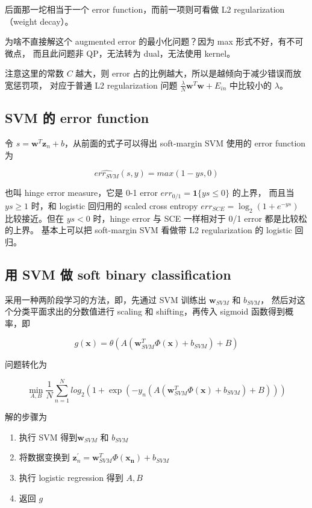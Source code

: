 \documentclass[a4paper]{article}
\begin{document}
后面那一坨相当于一个 error function，而前一项则可看做 L2 regularization（weight decay）。

为啥不直接解这个 augmented error 的最小化问题？因为 max 形式不好，有不可微点，
而且此问题非 QP，无法转为 dual，无法使用 kernel。

注意这里的常数 $C$ 越大，则 error 占的比例越大，所以是越倾向于减少错误而放宽惩罚项，
对应于普通 L2 regularization 问题 $\displaystyle \frac{\lambda}{N}\mathbf{w}^T\mathbf{w} + E_{in}$
中比较小的 $\lambda$。

\subsection{SVM 的 error function}
令 $s = \mathbf{w}^T\mathbf{z}_n + b$，从前面的式子可以得出 soft-margin SVM 使用的 error function 为

$$\widehat{err_{SVM}}(s, y) = max(1 - ys, 0)$$

也叫 hinge error measure，它是 0-1 error $err_{0/1} = \mathbf{1}\{ys \le 0\}$ 的上界，
而且当 $ys \ge 1$ 时，和 logistic 回归用的 scaled cross entropy $err_{SCE} = \log_2(1 + e^{-ys})$
比较接近。但在 $ys < 0$ 时，hinge error 与 SCE 一样相对于 0/1 error 都是比较松的上界。
基本上可以把 soft-margin SVM 看做带 L2 regularization 的 logistic 回归。


\subsection{用 SVM 做 soft binary classification}
采用一种两阶段学习的方法，即，先通过 SVM 训练出 $\mathbf{w}_{SVM}$ 和 $b_{SVM}$，
然后对这个分类平面求出的分数值进行 scaling 和 shifting，再传入 sigmoid 函数得到概率，即

$$g(\mathbf{x}) = \theta \left ( A(\mathbf{w}_{SVM}^T\Phi(\mathbf{x}) + b_{SVM}) + B\right )$$

问题转化为

$$\operatorname*{min}_{A, B} \frac{1}{N}\sum_{n=1}^{N} log_2 \left ( 1 + \exp \left ( -y_n \left ( A(\mathbf{w}_{SVM}^T\Phi(\mathbf{x}) + b_{SVM}) + B \right ) \right ) \right )$$

解的步骤为
\begin{enumerate}
  \item 执行 SVM 得到$\mathbf{w}_{SVM}$ 和 $b_{SVM}$
  \item 将数据变换到 $\mathbf{z}_n^{\prime} = \mathbf{w}_{SVM}^T\Phi(\mathbf{x_n}) + b_{SVM}$
  \item 执行 logistic regression 得到 $A, B$
  \item 返回 $g$
\end{enumerate}
\end{document}
